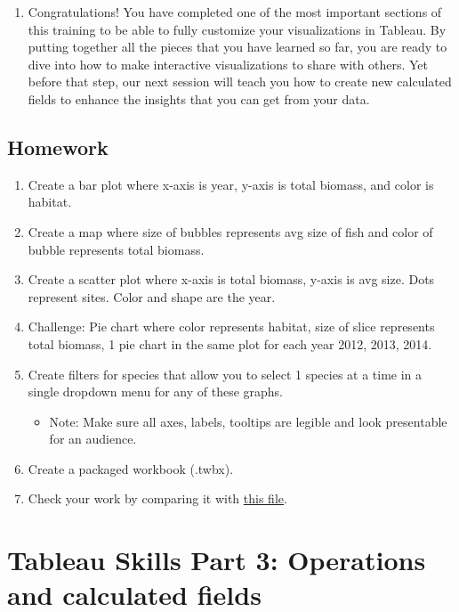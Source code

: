 \documentclass[
]{book}
\providecommand{\tightlist}{%
  \setlength{\itemsep}{0pt}\setlength{\parskip}{0pt}}
\begin{document}
\begin{enumerate}
\def\labelenumi{\arabic{enumi}.}
\tightlist
\item
  Congratulations! You have completed one of the most important sections of this training to be able to fully customize your visualizations in Tableau. By putting together all the pieces that you have learned so far, you are ready to dive into how to make interactive visualizations to share with others. Yet before that step, our next session will teach you how to create new calculated fields to enhance the insights that you can get from your data.
\end{enumerate}

\hypertarget{homework}{%
\subsection{Homework}\label{homework}}

\begin{enumerate}
\def\labelenumi{\arabic{enumi}.}
\tightlist
\item
  Create a bar plot where x-axis is year, y-axis is total biomass, and color is habitat.
\item
  Create a map where size of bubbles represents avg size of fish and color of bubble represents total biomass.
\item
  Create a scatter plot where x-axis is total biomass, y-axis is avg size. Dots represent sites. Color and shape are the year.
\item
  Challenge: Pie chart where color represents habitat, size of slice represents total biomass, 1 pie chart in the same plot for each year 2012, 2013, 2014.
\item
  Create filters for species that allow you to select 1 species at a time in a single dropdown menu for any of these graphs.

  \begin{itemize}
  \tightlist
  \item
    Note: Make sure all axes, labels, tooltips are legible and look presentable for an audience.
  \end{itemize}
\item
  Create a packaged workbook (.twbx).
\item
  Check your work by comparing it with \href{files/M3S3_exercise_key.twbx}{this file}.
\end{enumerate}

\hypertarget{tableau-skills-part-3-operations-and-calculated-fields}{%
\section{Tableau Skills Part 3: Operations and calculated fields}\label{tableau-skills-part-3-operations-and-calculated-fields}}
\end{document}
